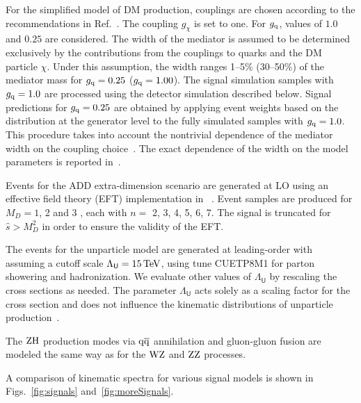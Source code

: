 For the simplified model of DM production, couplings are chosen according to the recommendations in Ref.~\cite{Boveia:2016mrp}.
The coupling $g_{\chi}$ is set to one. For $g_{\mathrm{q}}$, values of $1.0$ and $0.25$ are considered. The width of the mediator is assumed to be determined exclusively by the contributions from the couplings to quarks and the DM particle $\chi$. Under this assumption, the width ranges 1--5\% (30--50\%) of the mediator mass for $g_{\mathrm{q}}=0.25$ ($g_{\mathrm{q}}=1.00$).
The signal simulation samples with $g_{\mathrm{q}}=1.0$ are processed using the detector simulation described below.
Signal predictions for $g_{\mathrm{q}}=0.25$ are obtained by applying event weights based on the \ETm distribution at the generator level to the fully simulated samples with $g_{\mathrm{q}}=1.0$.
This procedure takes into account the nontrivial dependence of the mediator width on the coupling choice~\cite{Boveia:2016mrp}.  The exact dependence of the width on the model parameters is reported in~\cite{Boveia:2016mrp}.

Events for the ADD extra-dimension scenario are generated at LO using an effective field theory (EFT) implementation in ~\cite{Ask:2008fh,Ask:2009pv}. Event samples are produced for $M_{D} = 1$, 2 and 3 \TeV, each with $n =$ 2, 3, 4, 5, 6, 7.
The signal is truncated for $\hat{s} > M_{D}^2$ in order to ensure the validity of the EFT.

The events for the unparticle model are generated at leading-order with ~\cite{Ask:2008fh,Ask:2009pv}
assuming a cutoff scale $\Lambda_{\textsf{U}}=15\,\text{Te\hspace{-.08em}V}$, 
using tune CUETP8M1 for parton showering and hadronization. 
We evaluate other values of $\Lambda_{\textsf{U}}$ by rescaling the cross sections as needed.
The parameter $\Lambda_{\textsf{U}}$ acts solely as a scaling factor
for the cross section and does not influence the kinematic distributions of unparticle production~\cite{Ask:2009pv}.

The $\mathrm{Z}\mathrm{H}$ production modes via $\mathrm{q}\mathrm{\overline{q}}$ annihilation and gluon-gluon fusion are modeled the same way as for the $\mathrm{W}\mathrm{Z}$ and $\mathrm{Z}\mathrm{Z}$ processes.

A comparison of kinematic spectra for various signal models is shown in Figs.~\ref{fig:signals} and~\ref{fig:moreSignals}.

